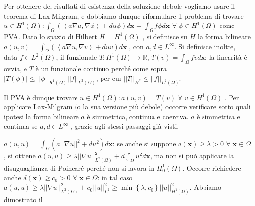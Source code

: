 \documentclass{article}
\begin{document}
Per ottenere dei risultati di esistenza della soluzione debole vogliamo
usare il teorema di Lax-Milgram, e dobbiamo dunque riformulare il problema
di trovare $u\in H^{1}\left( \Omega \right) :\int_{\Omega }\left(
\left\langle a\nabla u,\nabla \phi \right\rangle +du\phi \right) d\mathbf{x}%
=\int_{\Omega }f\phi d\mathbf{x}$ $\forall $ $\phi \in H^{1}\left( \Omega
\right) $ come PVA. Dato lo spazio di Hilbert $H=H^{1}\left( \Omega \right) $%
, si definisce su $H$ la forma bilineare $a\left( u,v\right) =\int_{\Omega
}\left( \left\langle a\nabla u,\nabla v\right\rangle +duv\right) d\mathbf{x}$%
, con $a,d\in L^{\infty }$. Si definisce inoltre, data $f\in L^{2}\left(
\Omega \right) $, il funzionale $T:H^{1}\left( \Omega \right) \rightarrow 
\mathbb{R}
$, $T\left( v\right) =\int_{\Omega }fvd\mathbf{x}$: la linearit\`{a} \`{e}
ovvia, e $T$ \`{e} un funzionale continuo perch\'{e} come sopra $\left\vert
T\left( \phi \right) \right\vert \leq \left\vert \left\vert \phi \right\vert
\right\vert _{H^{1}\left( \Omega \right) }\left\vert \left\vert f\right\vert
\right\vert _{L^{2}\left( \Omega \right) }$, per cui $\left\vert \left\vert
T\right\vert \right\vert _{H^{\ast }}\leq \left\vert \left\vert f\right\vert
\right\vert _{L^{2}\left( \Omega \right) }$.

Il PVA \`{e} dunque trovare $u\in H^{1}\left( \Omega \right) :a\left(
u,v\right) =T\left( v\right) $ $\forall $ $v\in H^{1}\left( \Omega \right) $%
. Per applicare Lax-Milgram (o la sua versione pi\`{u} debole) occorre
verificare sotto quali ipotesi la forma bilineare $a$ \`{e} simmetrica,
continua e coerciva. $a$ \`{e} simmetrica e continua se $a,d\in L^{\infty }$%
, grazie agli stessi passaggi gi\`{a} visti.

$a\left( u,u\right) =\int_{\Omega }\left( a\left\vert \left\vert \nabla
u\right\vert \right\vert ^{2}+du^{2}\right) d\mathbf{x}$: se anche si
suppone $a\left( \mathbf{x}\right) \geq \lambda >0$ $\forall $ $\mathbf{x}%
\in \Omega $, si ottiene $a\left( u,u\right) \geq \lambda \left\vert
\left\vert \nabla u\right\vert \right\vert _{L^{2}\left( \Omega \right)
}^{2}+d\int_{\Omega }u^{2}d\mathbf{x}$, ma non si pu\`{o} applicare la
disuguaglianza di Poincar\'{e} perch\'{e} non si lavora in $H_{0}^{1}\left(
\Omega \right) $. Occorre richiedere anche $d\left( \mathbf{x}\right) \geq
c_{0}>0$ $\forall $ $\mathbf{x}\in \Omega $: in tal caso $a\left( u,u\right)
\geq \lambda \left\vert \left\vert \nabla u\right\vert \right\vert
_{L^{2}\left( \Omega \right) }^{2}+c_{0}\left\vert \left\vert u\right\vert
\right\vert _{L^{2}}^{2}\geq \min \left\{ \lambda ,c_{0}\right\} \left\vert
\left\vert u\right\vert \right\vert _{H^{1}\left( \Omega \right) }^{2}$.
Abbiamo dimostrato il
\end{document}
